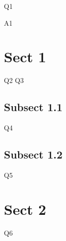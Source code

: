 \documentclass{exam}
\begin{document}
\begin{questions}
\question Q1

\begin{solution}
A1
\end{solution}
\end{questions}


\section{Sect 1}

\begin{questions}
\question Q2
\question Q3
\end{questions}

\subsection{Subsect 1.1}

\begin{questions}
\question Q4
\end{questions}

\subsection{Subsect 1.2}

\begin{questions}
\question Q5
\end{questions}

\section{Sect 2}

\begin{questions}
\question Q6
\end{questions}
\end{document}
